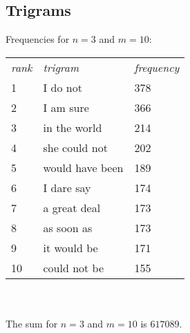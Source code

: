 \documentclass[10pt,a4paper]{article}
\begin{document}
\newpage
\subsection{Trigrams}
Frequencies for $n = 3$ and $m = 10$:\\

\begin{tabular}{l l l}
\textit{rank}&	\textit{trigram}	& \textit{frequency} \\
1	&	I do not		&	 378 \\
2	&	I am sure		&	 366 \\
3	&	in the world	&	 214 \\
4	&	she could not	&	 202 \\
5	&	would have been	&	 189 \\
6	&	I dare say		&	 174 \\
7	&	a great deal	&	 173 \\
8	&	as soon as		&	 173 \\
9	&	it would be		&	 171 \\
10	&	could not be	&	 155 \\
\end{tabular}\\
\\
The sum for $n = 3$ and $m = 10$ is $617089$.
\end{document}
